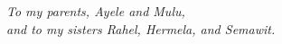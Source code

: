 {}
\vspace*{2.5cm}
\begin{center}
    \textit{To my parents, Ayele and Mulu, \\
    and to my sisters Rahel, Hermela, and Semawit.}
\end{center}

